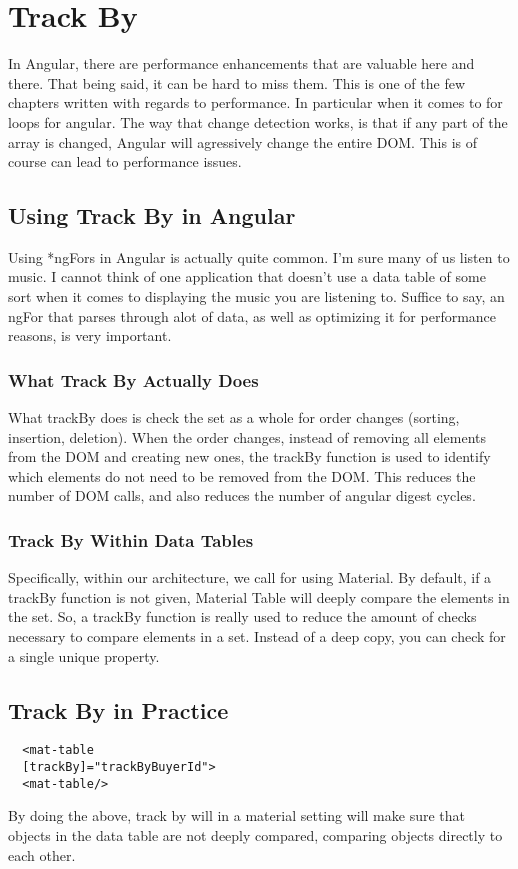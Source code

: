 \section{ Track By }


In Angular, there are performance enhancements that are valuable here and there.
That being said, it can be hard to miss them. This is one of the few chapters
written with regards to performance. In particular when it comes to for loops
for angular. The way that change detection works, is that if any part of the
array is changed, Angular will agressively change the entire DOM. This is of
course can lead to performance issues.

\subsection{ Using Track By in Angular }
Using *ngFors in Angular is actually quite common. I'm sure many of us listen
to music. I cannot think of one application that doesn't use a data table of
some sort when it comes to displaying the music you are listening to. Suffice
to say, an ngFor that parses through alot of data, as well as optimizing it for
performance reasons, is very important.

\subsubsection{ What Track By Actually Does }

What trackBy does is check the set as a whole for order changes (sorting,
insertion, deletion). When the order changes, instead of removing all elements
from the DOM and creating new ones, the trackBy function is used to identify
which elements do not need to be removed from the DOM. This reduces the number
of DOM calls, and also reduces the number of angular digest cycles.


\subsubsection{ Track By Within Data Tables }
Specifically, within our architecture, we call for using Material. By default,
if a trackBy function is not given, Material Table will deeply compare the
elements in the set. So, a trackBy function is really used to reduce the amount
of checks necessary to compare elements in a set. Instead of a deep copy, you
can check for a single unique property.

\subsection{ Track By in Practice }
\begin{lstlisting}
  <mat-table
  [trackBy]="trackByBuyerId">
  <mat-table/>
\end{lstlisting}

By doing the above, track by will in a material setting will make sure that
objects in the data table are not deeply compared, comparing objects directly to
each other. 
